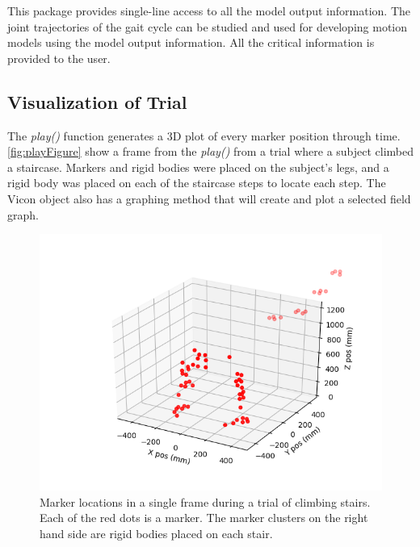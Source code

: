 

This package provides single-line access to all the model output information. The joint trajectories of the gait cycle can be studied and used for developing motion models using the model output information. All the critical information is provided to the user.  



\subsection{Visualization of Trial}
The \textit{play()} function generates a 3D plot of every marker position through time. \autoref{fig:playFigure} show a frame from the \textit{play()} from a trial where a subject climbed a staircase. Markers and rigid bodies were placed on the subject's legs, and a rigid body was placed on each of the staircase steps to locate each step. The Vicon object also has a graphing method that will create and plot a selected field graph.

\begin{figure}
    \centering
    \includegraphics[scale=0.6]{images/software/play.png}
   \caption[Play Demonstration]{Marker locations in a single frame during a trial of climbing stairs. Each of the red dots is a marker. The marker clusters on the right hand side are rigid bodies placed on each stair. }
    \label{fig:playFigure}
\end{figure}

